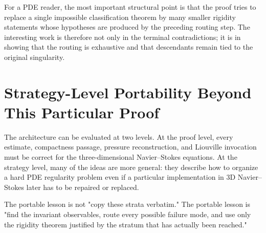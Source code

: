 \documentclass[11pt]{amsart}
\begin{document}
For a PDE reader, the most important structural point is that the proof tries to replace a single impossible classification theorem by many smaller rigidity statements whose hypotheses are produced by the preceding routing step.  The interesting work is therefore not only in the terminal contradictions; it is in showing that the routing is exhaustive and that descendants remain tied to the original singularity.

\section{Strategy-Level Portability Beyond This Particular Proof}

The architecture can be evaluated at two levels.  At the proof level, every estimate, compactness passage, pressure reconstruction, and Liouville invocation must be correct for the three-dimensional Navier--Stokes equations. At the strategy level, many of the ideas are more general: they describe how to organize a hard PDE regularity problem even if a particular implementation in 3D Navier--Stokes later has to be repaired or replaced.

The portable lesson is not "copy these strata verbatim."  The portable lesson is "find the invariant observables, route every possible failure mode, and use only the rigidity theorem justified by the stratum that has actually been reached."
\end{document}
